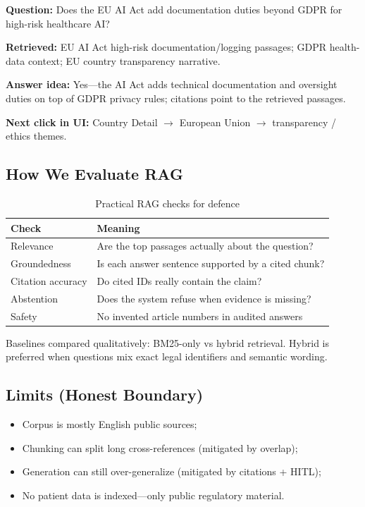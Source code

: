 \textbf{Question:} Does the EU AI Act add documentation duties beyond GDPR for high-risk
healthcare AI?

\textbf{Retrieved:} EU AI Act high-risk documentation/logging passages; GDPR health-data
context; EU country transparency narrative.

\textbf{Answer idea:} Yes---the AI Act adds technical documentation and oversight duties
on top of GDPR privacy rules; citations point to the retrieved passages.

\textbf{Next click in UI:} Country Detail $\rightarrow$ European Union $\rightarrow$
transparency / ethics themes.

\subsection{How We Evaluate RAG}
\label{sec:rag-eval}

\begin{table}[htbp]
\centering
\caption{Practical RAG checks for defence}
\label{tab:rag-eval}
\begin{tabular}{@{}p{3.4cm}p{8.0cm}@{}}
\toprule
\textbf{Check} & \textbf{Meaning} \\
\midrule
Relevance & Are the top passages actually about the question? \\
Groundedness & Is each answer sentence supported by a cited chunk? \\
Citation accuracy & Do cited IDs really contain the claim? \\
Abstention & Does the system refuse when evidence is missing? \\
Safety & No invented article numbers in audited answers \\
\bottomrule
\end{tabular}
\end{table}

Baselines compared qualitatively: BM25-only vs hybrid retrieval. Hybrid is preferred
when questions mix exact legal identifiers and semantic wording.

\subsection{Limits (Honest Boundary)}
\label{sec:rag-limits}

\begin{itemize}[noitemsep]
  \item Corpus is mostly English public sources;
  \item Chunking can split long cross-references (mitigated by overlap);
  \item Generation can still over-generalize (mitigated by citations + HITL);
  \item No patient data is indexed---only public regulatory material.
\end{itemize}

